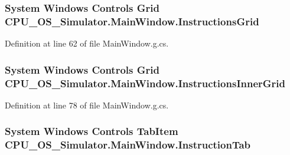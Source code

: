\subsubsection[{Instructions\+Grid}]{\setlength{\rightskip}{0pt plus 5cm}System Windows Controls Grid C\+P\+U\+\_\+\+O\+S\+\_\+\+Simulator.\+Main\+Window.\+Instructions\+Grid\hspace{0.3cm}{\ttfamily [package]}}\label{class_c_p_u___o_s___simulator_1_1_main_window_a2e6841673af413e8a8f8ba8aa0d7c80b}


Definition at line 62 of file Main\+Window.\+g.\+cs.

\hypertarget{class_c_p_u___o_s___simulator_1_1_main_window_a94a99eeb7f5fcfcfbdc375937d5439e7}{}
\subsubsection[{Instructions\+Inner\+Grid}]{\setlength{\rightskip}{0pt plus 5cm}System Windows Controls Grid C\+P\+U\+\_\+\+O\+S\+\_\+\+Simulator.\+Main\+Window.\+Instructions\+Inner\+Grid\hspace{0.3cm}{\ttfamily [package]}}\label{class_c_p_u___o_s___simulator_1_1_main_window_a94a99eeb7f5fcfcfbdc375937d5439e7}


Definition at line 78 of file Main\+Window.\+g.\+cs.

\hypertarget{class_c_p_u___o_s___simulator_1_1_main_window_a4fe9f6d97eb1f2c45b9e5a0363e61557}{}
\subsubsection[{Instruction\+Tab}]{\setlength{\rightskip}{0pt plus 5cm}System Windows Controls Tab\+Item C\+P\+U\+\_\+\+O\+S\+\_\+\+Simulator.\+Main\+Window.\+Instruction\+Tab\hspace{0.3cm}{\ttfamily [package]}}\label{class_c_p_u___o_s___simulator_1_1_main_window_a4fe9f6d97eb1f2c45b9e5a0363e61557}


